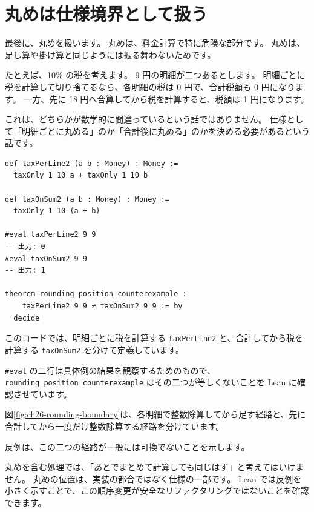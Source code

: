 \section{丸めは仕様境界として扱う}

最後に、丸めを扱います。
丸めは、料金計算で特に危険な部分です。
丸めは、足し算や掛け算と同じようには振る舞わないためです。

たとえば、10\% の税を考えます。
9 円の明細が二つあるとします。
明細ごとに税を計算して切り捨てるなら、各明細の税は 0 円で、合計税額も 0 円になります。
一方、先に 18 円へ合算してから税を計算すると、税額は 1 円になります。

これは、どちらかが数学的に間違っているという話ではありません。
仕様として「明細ごとに丸める」のか「合計後に丸める」のかを決める必要があるという話です。

\begin{listing}[htbp]
\begin{verbatim}
def taxPerLine2 (a b : Money) : Money :=
  taxOnly 1 10 a + taxOnly 1 10 b

def taxOnSum2 (a b : Money) : Money :=
  taxOnly 1 10 (a + b)

#eval taxPerLine2 9 9
-- 出力: 0
#eval taxOnSum2 9 9
-- 出力: 1

theorem rounding_position_counterexample :
    taxPerLine2 9 9 ≠ taxOnSum2 9 9 := by
  decide
\end{verbatim}
\caption{\texttt{rounding\_position\_counterexample}}
\label{lst:ch26-rounding-counterexample}
\end{listing}

このコードでは、明細ごとに税を計算する \texttt{taxPerLine2} と、合計してから税を計算する \texttt{taxOnSum2} を分けて定義しています。

\texttt{\#eval} の二行は具体例の結果を観察するためのもので、\texttt{rounding\_position\_counterexample} はその二つが等しくないことを Lean に確認させています。

図\ref{fig:ch26-rounding-boundary}は、各明細で整数除算してから足す経路と、先に合計してから一度だけ整数除算する経路を分けています。

反例は、この二つの経路が一般には可換でないことを示します。


丸めを含む処理では、「あとでまとめて計算しても同じはず」と考えてはいけません。
丸めの位置は、実装の都合ではなく仕様の一部です。
Lean では反例を小さく示すことで、この順序変更が安全なリファクタリングではないことを確認できます。

